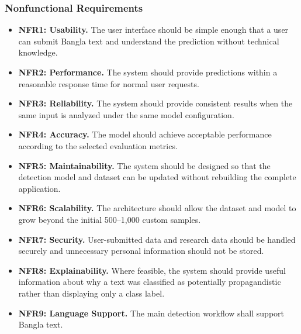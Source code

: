 \subsubsection*{Nonfunctional Requirements}
\begin{itemize}
  \item \textbf{NFR1: Usability.} The user interface should be simple enough that a
        user can submit Bangla text and understand the prediction without
        technical knowledge.
  \item \textbf{NFR2: Performance.} The system should provide predictions within a
        reasonable response time for normal user requests.
  \item \textbf{NFR3: Reliability.} The system should provide consistent results
        when the same input is analyzed under the same model configuration.
  \item \textbf{NFR4: Accuracy.} The model should achieve acceptable performance
        according to the selected evaluation metrics.
  \item \textbf{NFR5: Maintainability.} The system should be designed so that the
        detection model and dataset can be updated without rebuilding the complete
        application.
  \item \textbf{NFR6: Scalability.} The architecture should allow the dataset and
        model to grow beyond the initial 500--1,000 custom samples.
  \item \textbf{NFR7: Security.} User-submitted data and research data should be
        handled securely and unnecessary personal information should not be stored.
  \item \textbf{NFR8: Explainability.} Where feasible, the system should provide
        useful information about why a text was classified as potentially
        propagandistic rather than displaying only a class label.
  \item \textbf{NFR9: Language Support.} The main detection workflow shall support
        Bangla text.
\end{itemize}


